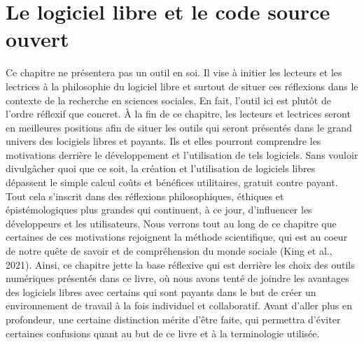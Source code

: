 \documentclass[
  letterpaper,
  DIV=11,
  numbers=noendperiod]{scrreprt}
\begin{document}

\hypertarget{sec-chap1}{%
\chapter{Le logiciel libre et le code source ouvert}\label{sec-chap1}}

Ce chapitre ne présentera pas un outil en soi. Il vise à initier les
lecteurs et les lectrices à la philosophie du logiciel libre et surtout
de situer ces réflexions dans le contexte de la recherche en sciences
sociales. En fait, l'outil ici est plutôt de l'ordre réflexif que
concret. À la fin de ce chapitre, les lecteurs et lectrices seront en
meilleures positions afin de situer les outils qui seront présentés dans
le grand univers des locigiels libres et payants. Ils et elles pourront
comprendre les motivations derrière le développement et l'utilisation de
tels logiciels. Sans vouloir divulgâcher quoi que ce soit, la création
et l'utilisation de logiciels libres dépassent le simple calcul coûts et
bénéfices utilitaires, gratuit contre payant. Tout cela s'inscrit dans
des réflexions philosophiques, éthiques et épistémologiques plus grandes
qui continuent, à ce jour, d'influencer les développeurs et les
utilisateurs. Nous verrons tout au long de ce chapitre que certaines de
ces motivations rejoignent la méthode scientifique, qui est au coeur de
notre quête de savoir et de compréhension du monde sociale (King et al.,
2021). Ainsi, ce chapitre jette la base réflexive qui est derrière les
choix des outils numériques présentés dans ce livre, où nous avons tenté
de joindre les avantages des logiciels libres avec certains qui sont
payants dans le but de créer un environnement de travail à la fois
individuel et collaboratif. Avant d'aller plus en profondeur, une
certaine distinction mérite d'être faite, qui permettra d'éviter
certaines confusions quant au but de ce livre et à la terminologie
utilisée.
\end{document}
